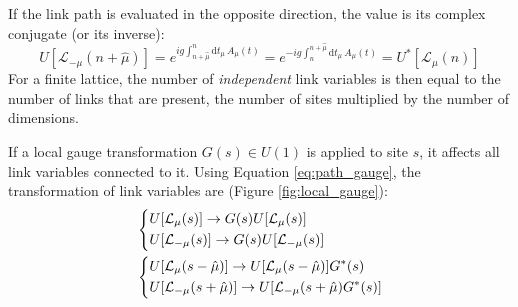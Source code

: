 If the link path is evaluated in the opposite direction, the value is its complex conjugate (or its inverse):
\[
    U[\mathcal L_{-\mu}(n+\hat\mu)] = e^{ig\int^n_{n+\hat\mu}\mathrm dt_\mu\,A_\mu(t)}
                                        = e^{-ig\int_n^{n+\hat\mu}\mathrm dt_\mu\,A_\mu(t)} = U^*[\mathcal L_{\mu}(n)]
\]
For a finite lattice, the number of \emph{independent} link variables is then equal to the number of links that are present,
\ie the number of sites multiplied by the number of dimensions.

If a local gauge transformation $G(s) \in U(1)$ is applied to site $s$, it affects all link variables connected to it.
Using Equation \eqref{eq:path_gauge}, the transformation of link variables are (Figure \ref{fig:local_gauge}):
\begin{equation}\label{eq:site_gauge}
    \begin{aligned}
        &\begin{dcases}
            U[\mathcal L_\mu(s)] \rightarrow G(s)U[\mathcal L_\mu(s)] \\
            U[\mathcal L_{-\mu}(s)] \rightarrow G(s)U[\mathcal L_{-\mu}(s)]
        \end{dcases} \\
        &\begin{dcases}
            U[\mathcal L_\mu(s-\hat\mu)] \rightarrow U[\mathcal L_\mu(s-\hat\mu)]G^*(s) \\
            U[\mathcal L_{-\mu}(s+\hat\mu)] \rightarrow U[\mathcal L_{-\mu}(s+\hat\mu)G^*(s)]
        \end{dcases}
    \end{aligned}
\end{equation}

